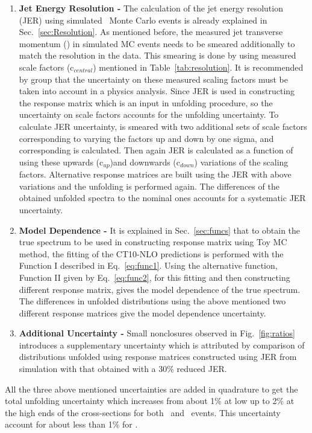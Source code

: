 \begin{enumerate}
\item {\bf Jet Energy Resolution -} The calculation of the jet energy resolution (JER) using simulated \MGP~Monte Carlo events is already explained in Sec.~\ref{sec:Resolution}. As mentioned before, the measured jet transverse momentum (\ptn) in simulated MC events needs to be smeared additionally to match the resolution in the data. This smearing is done by using measured scale factors (c$_{central}$) mentioned in Table~\ref{tab:resolution}. It is recommended by \JetMet group that the uncertainty on these measured scaling factors must be taken into account in a physics analysis. Since JER is used in constructing the response matrix which is an input in unfolding procedure, so the uncertainty on scale factors accounts for the unfolding uncertainty. To calculate JER uncertainty, \pt is smeared with two additional sets of scale factors corresponding to varying the factors up and down by one sigma, and corresponding \httwo is calculated. Then again JER is calculated as a function of \httwo using these upwards (c$_{up}$)and downwards (c$_{down}$) variations of the scaling factors. Alternative response matrices are built using the JER with above variations and the unfolding is performed again. The differences of the obtained unfolded spectra to the nominal ones accounts for a systematic JER uncertainty. 

\item {\bf Model Dependence -} It is explained in Sec.~\ref{sec:funcs} that to obtain the true \httwo spectrum to be used in constructing response matrix using Toy MC method, the fitting of the CT10-NLO predictions is performed with the Function I described in Eq.~\ref{eq:func1}. Using the alternative function, Function II given by Eq.~\ref{eq:func2}, for this fitting and then constructing different response matrix, gives the model dependence of the true \httwo spectrum. The differences in unfolded distributions using the above mentioned two different response matrices give the model dependence uncertainty.

\item {\bf Additional Uncertainty -} Small nonclosures observed in Fig.~\ref{fig:ratios} introduces a supplementary uncertainty which is attributed by comparison of distributions unfolded using response matrices constructed using JER from simulation with that obtained with a 30\% reduced JER. 
\end{enumerate}

All the three above mentioned uncertainties are added in quadrature to get the total unfolding uncertainty which increases from about 1\% at low \httwo up to 2\% at the high \httwo ends of the cross-sections for both \njt~and \njth~events. This uncertainty account for about less than 1\% for \ratio.

